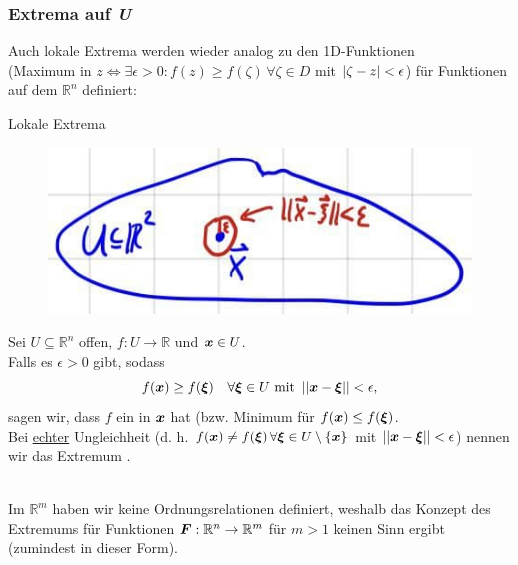 \subsubsection{Extrema auf \textit{U}}
Auch lokale Extrema werden wieder analog zu den 1D-Funktionen\\
(Maximum in $z\iff\exists \epsilon>0: f(z)\geq f(\zeta)\,\forall\zeta\in D$ mit $\left|{\zeta-z}\right|<\epsilon$) für Funktionen auf dem $\mathbb{R}^n$ definiert:
\begin{Def}
{Lokale Extrema}
\begin{figure}
 \vspace{-15pt}
\includegraphics[width=.25\textwidth]{Dateien/08/08Extremum.jpg}
 \vspace{-15pt}
\end{figure}
Sei $U\subseteq\mathbb{R}^n$ offen, $f:U\to\mathbb{R}$ und ${{\text{\boldmath${x}$}}}\in U$.\\
Falls es $\epsilon>0$ gibt, sodass
\begin{equation}
    f({{\text{\boldmath${x}$}}})\geq f({{\text{\boldmath${\xi}$}}})\quad\forall{{\text{\boldmath${\xi}$}}}\in U \text{ mit }\left|\left|{{\text{\boldmath${x}$}}}-{{\text{\boldmath${\xi}$}}}\right|\right|<\epsilon,
\end{equation}
sagen wir, dass $f$ ein  in ${{\text{\boldmath${x}$}}}$ hat (bzw. Minimum für $f({{\text{\boldmath${x}$}}})\leq f({{\text{\boldmath${\xi}$}}})$.\\
Bei \underline{echter} Ungleichheit (d. h. $f({{\text{\boldmath${x}$}}})\neq f({{\text{\boldmath${\xi}$}}})\,\forall{{\text{\boldmath${\xi}$}}}\in U\setminus\left\{{\text{\boldmath${x}$}}\right\}$ mit $\left|\left|{{\text{\boldmath${x}$}}}-{{\text{\boldmath${\xi}$}}}\right|\right|<\epsilon$) nennen wir das Extremum .
\end{Def}
\\
Im $\mathbb{R}^m$ haben wir keine Ordnungsrelationen definiert, weshalb das Konzept des Extremums für Funktionen ${{\text{\boldmath${F}$}}}:\mathbb{R}^n\to\mathbb{R}^m$ für $m>1$ keinen Sinn ergibt (zumindest in dieser Form).

